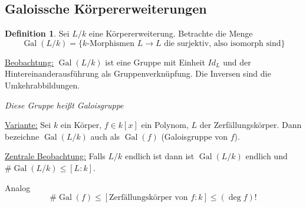 \documentclass[12pt,parskip=full]{scrartcl}
\newcommand{\heading}{\underline}
\DeclareMathOperator{\Gal}{Gal}
\theoremstyle{definition}
\newtheorem{definition}[theorem]{Definition}
\theoremstyle{remark}
\begin{document}
	\subsection{Galoissche Körpererweiterungen}
	
	\begin{definition}
		Sei $L/k$ eine Körpererweiterung. Betrachte die Menge
		\begin{equation*}
			\Gal(L/k) = \{ \text{$k$-Morphismen $L \to L$ die surjektiv, also isomorph sind} \}
		\end{equation*}
	\end{definition}

	\heading{Beobachtung:} $\Gal(L/k)$ ist eine Gruppe mit Einheit $Id_L$ und der Hintereinanderausführung als Gruppenverknüpfung. Die Inversen sind die Umkehrabbildungen.
	
	\textit{Diese Gruppe heißt Galoisgruppe}
	
	\heading{Variante:} Sei $k$ ein Körper, $f \in k[x]$ ein Polynom, $L$ der Zerfällungskörper. Dann bezeichne $\Gal(L/k)$ auch als $\Gal(f)$ (Galoisgruppe von $f$).
	
	\heading{Zentrale Beobachtung:} Falls $L/k$ endlich ist dann ist $\Gal(L/k)$ endlich und $\#\Gal(L/k) \leq [L: k]$.
	
	Analog
	\begin{equation*}
		\#\Gal(f) \leq [ \text{Zerfällungskörper von $f$}: k ] \leq (\deg f)!
	\end{equation*}
	
\end{document}
